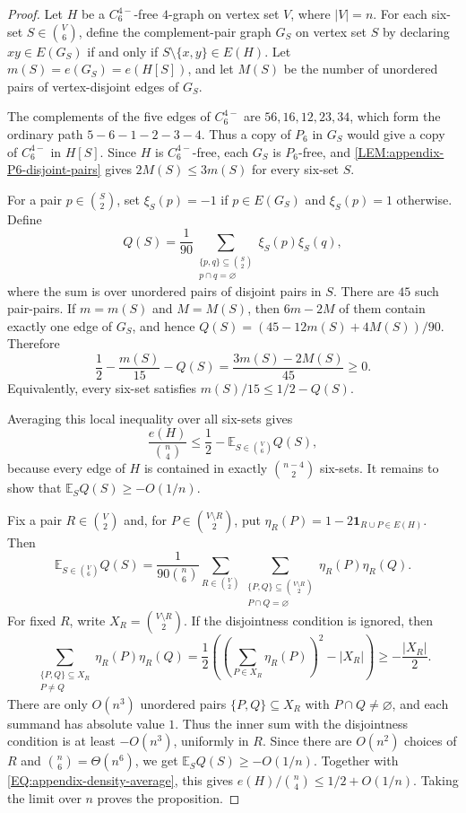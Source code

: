 \documentclass[10pt,a4paper]{article}
\theoremstyle{plain}
\theoremstyle{definition}
\begin{document}
\begin{proof}
Let $H$ be a $C_6^{4-}$-free $4$-graph on vertex set $V$, where $|V|=n$.
For each six-set $S\in\binom V6$, define the complement-pair graph $G_S$ on vertex set $S$ by declaring $xy\in E(G_S)$ if and only if $S\setminus\{x,y\}\in E(H)$.
Let $m(S)=e(G_S)=e(H[S])$, and let $M(S)$ be the number of unordered pairs of vertex-disjoint edges of $G_S$.

The complements of the five edges of $C_6^{4-}$ are $56,16,12,23,34$, which form the ordinary path $5-6-1-2-3-4$.
Thus a copy of $P_6$ in $G_S$ would give a copy of $C_6^{4-}$ in $H[S]$.
Since $H$ is $C_6^{4-}$-free, each $G_S$ is $P_6$-free, and \cref{LEM:appendix-P6-disjoint-pairs} gives $2M(S)\le3m(S)$ for every six-set $S$.

For a pair $p\in\binom S2$, set $\xi_S(p)=-1$ if $p\in E(G_S)$ and $\xi_S(p)=1$ otherwise.
Define
\[
Q(S)=\frac1{90}
\sum_{\substack{\{p,q\}\subseteq\binom S2\\ p\cap q=\varnothing}}
\xi_S(p)\xi_S(q),
\]
where the sum is over unordered pairs of disjoint pairs in $S$.
There are $45$ such pair-pairs.
If $m=m(S)$ and $M=M(S)$, then $6m-2M$ of them contain exactly one edge of $G_S$, and hence $Q(S)=(45-12m(S)+4M(S))/90$.
Therefore
\[
\frac12-\frac{m(S)}{15}-Q(S)
=\frac{3m(S)-2M(S)}{45}\ge0.
\]
Equivalently, every six-set satisfies $m(S)/15\le1/2-Q(S)$.

Averaging this local inequality over all six-sets gives
\begin{equation}\label{EQ:appendix-density-average}
\frac{e(H)}{\binom n4}
\le
\frac12-\mathbb E_{S\in\binom V6} Q(S),
\end{equation}
because every edge of $H$ is contained in exactly $\binom{n-4}{2}$ six-sets.
It remains to show that $\mathbb E_SQ(S)\ge -O(1/n)$.

Fix a pair $R\in\binom V2$ and, for $P\in\binom{V\setminus R}{2}$, put $\eta_R(P)=1-2\mathbf 1_{R\cup P\in E(H)}$.
Then
\[
\mathbb E_{S\in\binom V6}Q(S)
=\frac{1}{90\binom n6}
\sum_{R\in\binom V2}
\sum_{\substack{\{P,Q\}\subseteq\binom{V\setminus R}{2}\\ P\cap Q=\varnothing}}
\eta_R(P)\eta_R(Q).
\]
For fixed $R$, write $X_R=\binom{V\setminus R}{2}$.
If the disjointness condition is ignored, then
\[
\sum_{\substack{\{P,Q\}\subseteq X_R\\ P\ne Q}}
\eta_R(P)\eta_R(Q)
=\frac12\left(\left(\sum_{P\in X_R}\eta_R(P)\right)^2-|X_R|\right)
\ge -\frac{|X_R|}{2}.
\]
There are only $O(n^3)$ unordered pairs $\{P,Q\}\subseteq X_R$ with $P\cap Q\ne\varnothing$, and each summand has absolute value $1$.
Thus the inner sum with the disjointness condition is at least $-O(n^3)$, uniformly in $R$.
Since there are $O(n^2)$ choices of $R$ and $\binom n6=\Theta(n^6)$, we get $\mathbb E_SQ(S)\ge -O(1/n)$.
Together with \eqref{EQ:appendix-density-average}, this gives $e(H)/\binom n4\le1/2+O(1/n)$.
Taking the limit over $n$ proves the proposition.
\end{proof}
\end{document}
